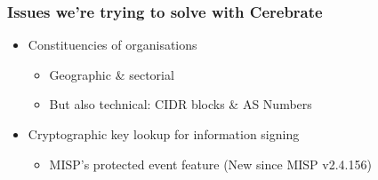 \begin{frame}
\frametitle{Issues we're trying to solve with Cerebrate}
    \begin{minipage}{0.8\textwidth}
        \begin{itemize}
            \item Constituencies of organisations
            \begin{itemize}
                \item Geographic \& sectorial
                \item But also technical: CIDR blocks \& AS Numbers
            \end{itemize}
            \item Cryptographic key lookup for information signing
            \begin{itemize}
                \item MISP's protected event feature (New since MISP v2.4.156)
            \end{itemize}
        \end{itemize}
    \end{minipage}
    \begin{minipage}{0.19\textwidth}
    \end{minipage}
\end{frame}

